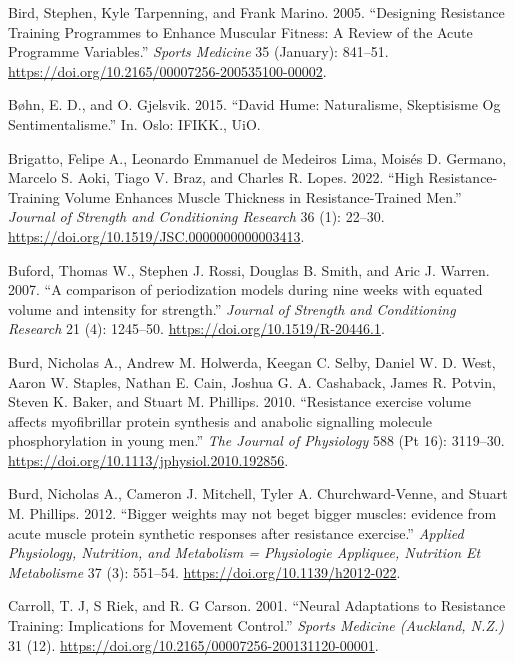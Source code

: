 \documentclass[
  letterpaper,
  DIV=11,
  numbers=noendperiod]{scrreprt}
\newlength{\cslhangindent}
\newlength{\cslentryspacingunit} %
\newenvironment{CSLReferences}[2] %
 {%
  \setlength{\parindent}{0pt}
  \ifodd #1
  \let\oldpar\par
  \def\par{\hangindent=\cslhangindent\oldpar}
  \fi
  \setlength{\parskip}{#2\cslentryspacingunit}
 }%
 {}
\begin{document}
\begin{CSLReferences}{1}{0}
\leavevmode{}%
Bird, Stephen, Kyle Tarpenning, and Frank Marino. 2005. {``Designing
Resistance Training Programmes to Enhance Muscular Fitness: A Review of
the Acute Programme Variables.''} \emph{Sports Medicine} 35 (January):
841--51. \url{https://doi.org/10.2165/00007256-200535100-00002}.

\leavevmode{}%
Bøhn, E. D., and O. Gjelsvik. 2015. {``David Hume: Naturalisme,
Skeptisisme Og Sentimentalisme.''} In. Oslo: IFIKK., UiO.

\leavevmode{}%
Brigatto, Felipe A., Leonardo Emmanuel de Medeiros Lima, Moisés D.
Germano, Marcelo S. Aoki, Tiago V. Braz, and Charles R. Lopes. 2022.
{``High Resistance-Training Volume Enhances Muscle Thickness in
Resistance-Trained Men.''} \emph{Journal of Strength and Conditioning
Research} 36 (1): 22--30.
\url{https://doi.org/10.1519/JSC.0000000000003413}.

\leavevmode{}%
Buford, Thomas W., Stephen J. Rossi, Douglas B. Smith, and Aric J.
Warren. 2007. {``A comparison of periodization models during nine weeks
with equated volume and intensity for strength.''} \emph{Journal of
Strength and Conditioning Research} 21 (4): 1245--50.
\url{https://doi.org/10.1519/R-20446.1}.

\leavevmode{}%
Burd, Nicholas A., Andrew M. Holwerda, Keegan C. Selby, Daniel W. D.
West, Aaron W. Staples, Nathan E. Cain, Joshua G. A. Cashaback, James R.
Potvin, Steven K. Baker, and Stuart M. Phillips. 2010. {``Resistance
exercise volume affects myofibrillar protein synthesis and anabolic
signalling molecule phosphorylation in young men.''} \emph{The Journal
of Physiology} 588 (Pt 16): 3119--30.
\url{https://doi.org/10.1113/jphysiol.2010.192856}.

\leavevmode{}%
Burd, Nicholas A., Cameron J. Mitchell, Tyler A. Churchward-Venne, and
Stuart M. Phillips. 2012. {``Bigger weights may not beget bigger
muscles: evidence from acute muscle protein synthetic responses after
resistance exercise.''} \emph{Applied Physiology, Nutrition, and
Metabolism = Physiologie Appliquee, Nutrition Et Metabolisme} 37 (3):
551--54. \url{https://doi.org/10.1139/h2012-022}.

\leavevmode{}%
Carroll, T. J, S Riek, and R. G Carson. 2001. {``Neural Adaptations to
Resistance Training: Implications for Movement Control.''} \emph{Sports
Medicine (Auckland, N.Z.)} 31 (12).
\url{https://doi.org/10.2165/00007256-200131120-00001}.


\end{CSLReferences}
\end{document}
